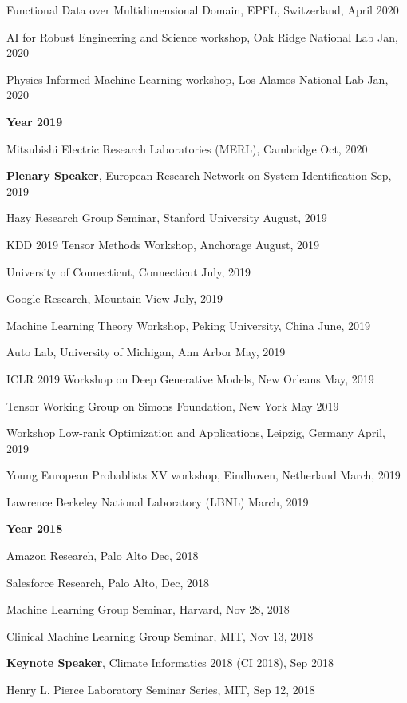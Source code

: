 \documentclass[margin,line]{res}
\begin{document}
\begin{resume}
 
 Functional Data over Multidimensional Domain, EPFL, Switzerland,   \hfill{April 2020}
 
 
AI for Robust Engineering and Science workshop,  Oak Ridge National Lab \hfill{Jan, 2020}
 
 
Physics Informed Machine Learning workshop,  Los Alamos National Lab \hfill {Jan, 2020}


 {\bf Year  2019}
 

Mitsubishi Electric Research Laboratories (MERL), Cambridge  \hfill {Oct, 2020}


\textbf{Plenary Speaker},  European Research Network on System Identification   \hfill {Sep, 2019}


Hazy Research Group Seminar,  Stanford University  \hfill {August, 2019}

KDD 2019 Tensor Methods Workshop, Anchorage \hfill{August, 2019}

University  of Connecticut,   Connecticut \hfill{July, 2019}

Google  Research, Mountain View \hfill{July, 2019}

Machine Learning Theory Workshop,  Peking University, China  \hfill{June, 2019}

Auto Lab, University of Michigan, Ann Arbor  \hfill{May, 2019}

ICLR 2019 Workshop on Deep Generative Models, New Orleans  \hfill{May, 2019}

Tensor Working Group  on Simons Foundation, New York  \hfill{May  2019}

Workshop Low-rank Optimization and Applications,  Leipzig, Germany \hfill{April, 2019}

 Young European Probablists XV workshop, Eindhoven, Netherland  \hfill{March, 2019}
 
 Lawrence Berkeley National Laboratory (LBNL) \hfill{March, 2019}

 {\bf Year  2018}
 
Amazon Research, Palo Alto \hfill{Dec, 2018}

Salesforce Research, Palo Alto, \hfill{Dec, 2018}

Machine Learning Group Seminar, Harvard, \hfill {Nov 28, 2018} 

Clinical Machine Learning Group Seminar, MIT, \hfill {Nov 13,  2018} 


\textbf{Keynote Speaker},  Climate Informatics 2018 (CI 2018), \hfill {Sep 2018} 


Henry L. Pierce Laboratory Seminar Series, MIT, \hfill {Sep 12, 2018}


\end{resume}
\end{document}
